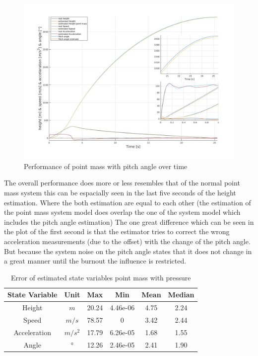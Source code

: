 \begin{figure}[h!]
 \centering
 \includegraphics[width=.8 \textwidth]{./Pictures/PointMassPitchAnglePerformance.jpg}
 \caption{Performance of point mass with pitch angle over time}
 \label{fig:PointMassPitchAnglePerformance}
\end{figure}

The overall performance does more or less resembles that of the normal point mass system this can be espacially seen in the last five seconds of the height estimation.
Where the both estimation are equal to each other (the estimation of the point mass system model does overlap the one of the system model which includes the pitch angle estimation)
The one great difference which can be seen in the plot of the first second is that the estimator tries to correct the wrong acceleration measurements (due to the offset) with the change of the pitch angle.
But because the system noise on the pitch angle states that it does not change in a great manner until the burnout the influence is restricted.

\begin{table}[h!]
\centering
\begin{tabular}{cccccc}
\hline
\multicolumn{1}{|c|}{State Variable} & \multicolumn{1}{c|}{Unit} & \multicolumn{1}{c|}{Max} & \multicolumn{1}{c|}{Min} & \multicolumn{1}{c|}{Mean} & \multicolumn{1}{c|}{Median} \\ \hline
Height                            & $m$                         & 20.24                  & 4.46e-06                 & 4.75                    & 2.24                      \\
Speed                             & $m/s$                       & 78.57                   & 0                        & 3.42                   & 2.44                      \\
Acceleration                      & $m/s^2$   			& 17.79                  & 6.26e-05                 & 1.68                    & 1.55                      \\
Angle	                  	  & $°$   			& 12.26                   & 2.46e-05                 & 2.41                  & 1.90                     
\end{tabular}
\caption{Error of estimated state variables point mass with pressure}
\label{tab:ErrorPointMassPitchAngle}
\end{table}

